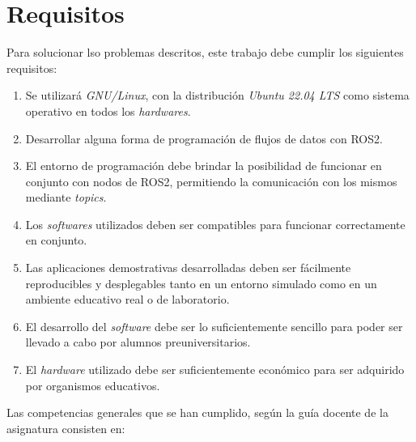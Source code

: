 
\section{Requisitos}
\label{sec:requisitos}

Para solucionar lso problemas descritos, este trabajo debe cumplir los
siguientes requisitos:

\begin{enumerate}
    \item{Se utilizará \textit{GNU/Linux}, con la distribución
        \textit{Ubuntu 22.04 LTS} como sistema operativo en todos los
        \textit{hardwares}.}
    \item{Desarrollar alguna forma de programación de flujos de datos con ROS2.}
    \item{El entorno de programación debe brindar la posibilidad de funcionar en
        conjunto con nodos de ROS2, permitiendo la comunicación con los mismos
        mediante \textit{topics}.}
    \item{Los \textit{softwares} utilizados deben ser compatibles para funcionar
        correctamente en conjunto.}
    \item{Las aplicaciones demostrativas desarrolladas deben ser fácilmente
        reproducibles y desplegables tanto en un entorno simulado como en un
        ambiente educativo real o de laboratorio.}
    \item{El desarrollo del \textit{software} debe ser lo suficientemente
        sencillo para poder ser llevado a cabo por alumnos preuniversitarios.}
    \item{El \textit{hardware} utilizado debe ser suficientemente económico para
        ser adquirido por organismos educativos.}
\end{enumerate}

Las competencias generales que se han cumplido, según la guía docente de la
asignatura consisten en:

